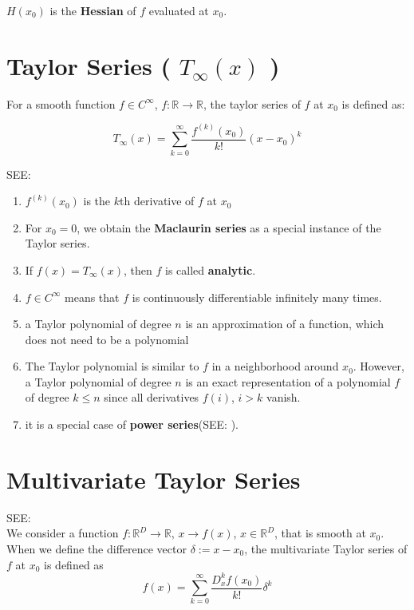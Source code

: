 $H(x_0)$ is the \textbf{Hessian} of $f$ evaluated at $x_0$.


\section{Taylor Series ( $T_\infty(x)$ )}\label{Taylor Series}
For a smooth function $f \in C^\infty$, $f : \mathbb{R} \rightarrow \mathbb{R}$, the taylor series of $f$ at $x_0$ is defined as:

\[
    T_\infty(x) = \sum_{k=0}^{\infty}\displaystyle\dfrac{f^{(k)}(x_0)}{k!}(x-x_0)^k
\]

SEE: 
\begin{enumerate}
    \item $f^{(k)}(x_0)$ is the $k$th derivative of $f$ at $x_0$

    \item For $x_0 = 0$, we obtain the \textbf{Maclaurin series} as a special instance of the Taylor series. 
    
    \item If $f(x) = T_\infty(x)$, then $f$ is called \textbf{analytic}.
    
    \item $f \in C^\infty$ means that $f$ is continuously differentiable infinitely many times.

    \item a Taylor polynomial of degree $n$ is an approximation of a function, which does not need to be a polynomial

    \item The Taylor polynomial is similar to $f$ in a neighborhood around $x_0$. However, a Taylor polynomial of degree $n$ is an exact representation of a polynomial $f$ of degree $k \leq n$ since all derivatives $f(i)$, $i > k$ vanish.

    \item it is a special case of \textbf{power series}(SEE: ).

\end{enumerate}


\section{Multivariate Taylor Series}\label{Multivariate Taylor Series}

SEE: \\
We consider a function $f : \mathbb{R}^D \rightarrow \mathbb{R}$, $x \rightarrow f(x)$, $x \in \mathbb{R}^D$, that is smooth at $x_0$. When we define the difference vector $\delta := x - x_0$, the multivariate Taylor series of $f$ at $x_0$ is defined as
\[
    f(x) = \sum_{k=0}^{\infty} \displaystyle\dfrac{D_x^k f(x_0)}{k!}\delta^k
\]

